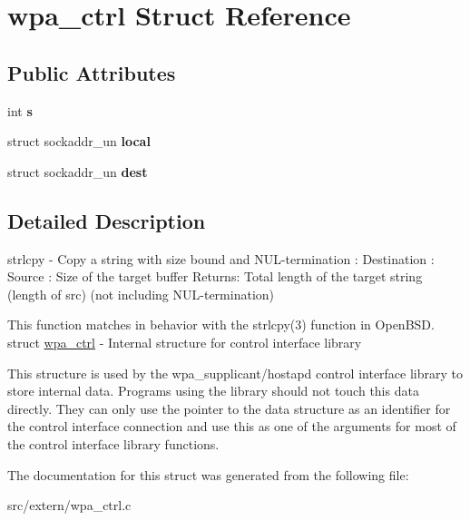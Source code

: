 \hypertarget{structwpa__ctrl}{\section{wpa\-\_\-ctrl Struct Reference}
\label{structwpa__ctrl}
}
\subsection*{Public Attributes}
\begin{DoxyCompactItemize}
\item 
\hypertarget{structwpa__ctrl_ac5d2fbfbd7247dcdbd6b271419465ee8}{int {\bfseries s}}\label{structwpa__ctrl_ac5d2fbfbd7247dcdbd6b271419465ee8}

\item 
\hypertarget{structwpa__ctrl_ab91fe974613c7fab068f3751cfcb094f}{struct sockaddr\-\_\-un {\bfseries local}}\label{structwpa__ctrl_ab91fe974613c7fab068f3751cfcb094f}

\item 
\hypertarget{structwpa__ctrl_a8817e5e94060f2ee19889f7fdafa8273}{struct sockaddr\-\_\-un {\bfseries dest}}\label{structwpa__ctrl_a8817e5e94060f2ee19889f7fdafa8273}

\end{DoxyCompactItemize}


\subsection{Detailed Description}
strlcpy -\/ Copy a string with size bound and N\-U\-L-\/termination \-: Destination \-: Source \-: Size of the target buffer Returns\-: Total length of the target string (length of src) (not including N\-U\-L-\/termination)

This function matches in behavior with the strlcpy(3) function in Open\-B\-S\-D. struct \hyperlink{structwpa__ctrl}{wpa\-\_\-ctrl} -\/ Internal structure for control interface library

This structure is used by the wpa\-\_\-supplicant/hostapd control interface library to store internal data. Programs using the library should not touch this data directly. They can only use the pointer to the data structure as an identifier for the control interface connection and use this as one of the arguments for most of the control interface library functions. 

The documentation for this struct was generated from the following file\-:\begin{DoxyCompactItemize}
\item 
src/extern/wpa\-\_\-ctrl.\-c\end{DoxyCompactItemize}
